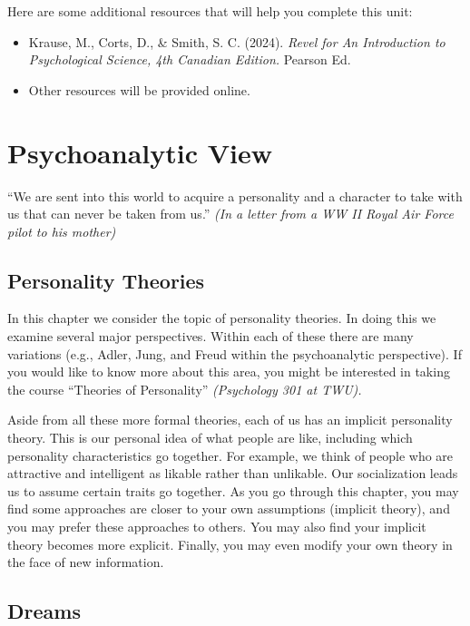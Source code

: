 \documentclass[
]{book}
\providecommand{\tightlist}{%
  \setlength{\itemsep}{0pt}\setlength{\parskip}{0pt}}
\begin{document}
Here are some additional resources that will help you complete this unit:

\begin{itemize}
\tightlist
\item
  Krause, M., Corts, D., \& Smith, S. C. (2024). \emph{Revel for An Introduction to Psychological Science, 4th Canadian Edition.} Pearson Ed.
\item
  Other resources will be provided online.
\end{itemize}

\hypertarget{psychoanalytic-view}{%
\section{Psychoanalytic View}\label{psychoanalytic-view}}

``We are sent into this world to acquire a personality and a character to take with us that can never be taken from us.'' \emph{(In a letter from a WW II Royal Air Force pilot to his mother)}

\hypertarget{personality-theories}{%
\subsection*{Personality Theories}\label{personality-theories}}

In this chapter we consider the topic of personality theories. In doing this we examine several major perspectives. Within each of these there are many variations (e.g., Adler, Jung, and Freud within the psychoanalytic perspective). If you would like to know more about this area, you might be interested in taking the course ``Theories of Personality'' \emph{(Psychology 301 at TWU).}

Aside from all these more formal theories, each of us has an implicit personality theory. This is our personal idea of what people are like, including which personality characteristics go together. For example, we think of people who are attractive and intelligent as likable rather than unlikable. Our socialization leads us to assume certain traits go together. As you go through this chapter, you may find some approaches are closer to your own assumptions (implicit theory), and you may prefer these approaches to others. You may also find your implicit theory becomes more explicit. Finally, you may even modify your own theory in the face of new information.

\hypertarget{dreams}{%
\subsection*{Dreams}\label{dreams}}
\end{document}
